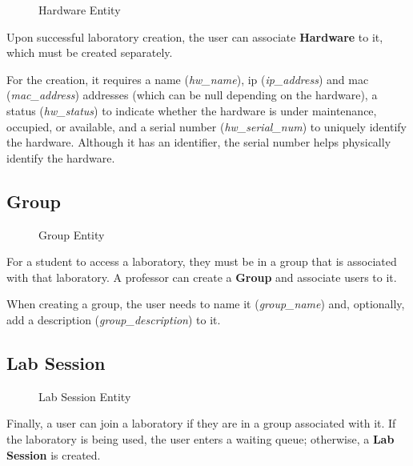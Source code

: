 \begin{figure}[H]
    \centering
    
    \caption{Hardware Entity}
    \label{fig:hardware_entity}
\end{figure}

Upon successful laboratory creation, the user can associate \textbf{Hardware} to it, which must be created separately.

For the creation, it requires a name (\textit{hw\_name}), \ac{ip} (\textit{ip\_address}) and \ac{mac} (\textit{mac\_address}) addresses (which can be null depending on the hardware), a status (\textit{hw\_status}) to indicate whether the hardware is under maintenance, occupied, or available, and a serial number (\textit{hw\_serial\_num}) to uniquely identify the hardware. Although it has an identifier, the serial number helps physically identify the hardware.    

\subsection*{Group}

\begin{figure}[H]
    \centering
    
    \caption{Group Entity}
    \label{fig:group_entity}
\end{figure}

For a student to access a laboratory, they must be in a group that is associated with that laboratory. A professor can create a \textbf{Group} and associate users to it.

When creating a group, the user needs to name it (\textit{group\_name}) and, optionally, add a description (\textit{group\_description}) to it.

\subsection*{Lab Session}

\begin{figure}[H]
    \centering
    
    \caption{Lab Session Entity}
    \label{fig:lab_session_entity}
\end{figure}

Finally, a user can join a laboratory if they are in a group associated with it. If the laboratory is being used, the user enters a waiting queue; otherwise, a \textbf{Lab Session} is created.

